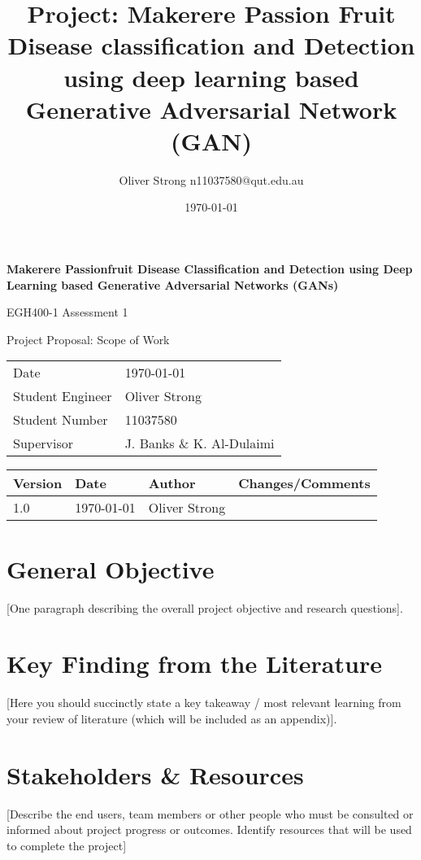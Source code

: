 \documentclass[11pt]{article}
\title{Project: Makerere Passion Fruit Disease classification and Detection using deep learning based Generative Adversarial Network (GAN)}
\author{Oliver Strong n11037580@qut.edu.au}
\date{\today}
\begin{document}
\begin{titlepage}
    \begin{center}
        \vspace*{1cm}
        {\huge \textbf{Makerere Passionfruit Disease Classification and Detection using Deep Learning based Generative Adversarial Networks (GANs)}}
        
        \vspace{0.5cm}
        {\Large EGH400-1 Assessment 1
        
        Project Proposal: Scope of Work}

        \vspace{0.5cm}
        \begin{tabular}{ll}
            Date & \today \\
            Student Engineer & Oliver Strong \\
            Student Number & 11037580 \\
            Supervisor & J. Banks \& K. Al-Dulaimi\\
        \end{tabular}
    \end{center}
    \begin{tabularx}{\textwidth}{@{}lllX@{}}
        \toprule
        Version & Date & Author & Changes/Comments\\
        \midrule
        1.0 & \today & Oliver Strong & \\
        \bottomrule
    \end{tabularx}
    
    \tableofcontents
\end{titlepage}

\newpage
\section{General Objective}
[One paragraph describing the overall project objective and research questions].

\section{Key Finding from the Literature}
[Here you should succinctly state a key takeaway / most relevant learning from your review of
literature (which will be included as an appendix)].

\section{Stakeholders \& Resources}
[Describe the end users, team members or other people who must be consulted or informed about
project progress or outcomes. Identify resources that will be used to complete the project]
\end{document}
